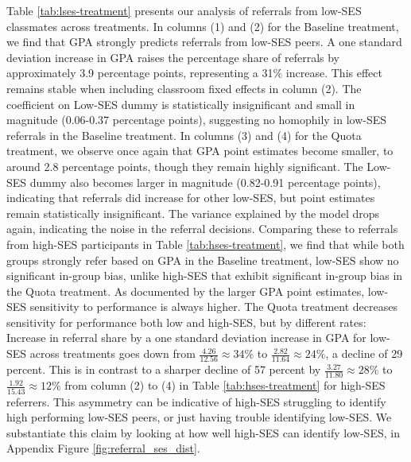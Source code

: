 \documentclass[11pt,a4paper,oneside]{article}
\begin{document}
Table \ref{tab:lses-treatment} presents our analysis of referrals from low-SES classmates across treatments. In columns (1) and (2) for the Baseline treatment, we find that GPA strongly predicts referrals from low-SES peers. A one standard deviation increase in GPA raises the percentage share of referrals by approximately 3.9 percentage points, representing a 31\% increase. This effect remains stable when including classroom fixed effects in column (2). The coefficient on Low-SES dummy is statistically insignificant and small in magnitude (0.06-0.37 percentage points), suggesting no homophily in low-SES referrals in the Baseline treatment. In columns (3) and (4) for the Quota treatment, we observe once again that GPA point estimates become smaller, to around 2.8 percentage points, though they remain highly significant. The Low-SES dummy also becomes larger in magnitude (0.82-0.91 percentage points), indicating that referrals did increase for other low-SES, but point estimates remain statistically insignificant. The variance explained by the model drops again, indicating the noise in the referral decisions. Comparing these to referrals from high-SES participants in Table \ref{tab:hses-treatment}, we find that while both groups strongly refer based on GPA in the Baseline treatment, low-SES show no significant in-group bias, unlike high-SES that exhibit significant in-group bias in the Quota treatment. As documented by the larger GPA point estimates, low-SES sensitivity to performance is always higher. The Quota treatment decreases sensitivity for performance both low and high-SES, but by different rates: Increase in referral share by a one standard deviation increase in GPA for low-SES across treatments goes down from $\frac{4.26}{12.56}\approx34\%$ to $\frac{2.82}{11.64}\approx24\%$, a decline of 29 percent. This is in contrast to a sharper decline of 57 percent by $\frac{3.27}{11.80}\approx28\%$ to $\frac{1.92}{15.43}\approx12\%$ from column (2) to (4) in Table \ref{tab:hses-treatment} for high-SES referrers. This asymmetry can be indicative of high-SES struggling to identify high performing low-SES peers, or just having trouble identifying low-SES. We substantiate this claim by looking at how well high-SES can identify low-SES, in Appendix Figure \ref{fig:referral_ses_dist}.    
\end{document}
